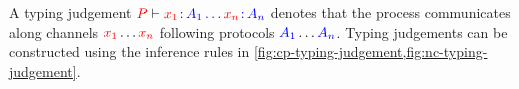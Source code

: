 \begin{definition}\label{def:cp-typing-judgement}
  A typing judgement $\seq[{ P }]{\tmty{x_1}{A_1}\dots\tmty{x_n}{A_n}}$ denotes
  that the process  communicates along channels $\tm{x_1}\dots\tm{x_n}$
  following protocols $\ty{A_1}\dots\ty{A_n}$.
  Typing judgements can be constructed using the inference rules in
  \cref{fig:cp-typing-judgement,fig:nc-typing-judgement}.
\end{definition}
